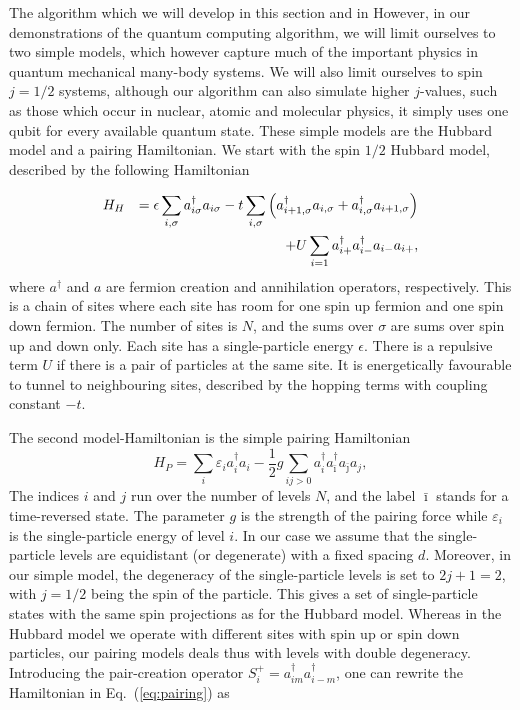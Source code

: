 \documentclass[%
oneside,                 %
final,                   %
10pt]{article}
\begin{document}
The algorithm which we will develop in this section and in
However, 
in our demonstrations of the quantum computing algorithm, we will limit ourselves to
two simple models, which however capture much of the important physics
in quantum mechanical 
many-body systems. We will also limit ourselves to spin $j=1/2$
systems, although our algorithm 
can also simulate  higher $j$-values, such as those which occur in nuclear, atomic and
molecular physics, it simply uses one qubit for every available
quantum state.   
These simple models are the Hubbard model and a pairing
Hamiltonian.
We start with the spin $1/2$ Hubbard model, described by the following Hamiltonian

\begin{align}
H_H &&= \epsilon \sum_{i, \sigma} a_{i\sigma}^\dag a_{i\sigma} 
-t \sum_{i, \sigma} \left(a^\dag_{i+1, \sigma}a_{i, \sigma}
+a^\dag_{i, \sigma}a_{i+1, \sigma} \right) \notag \\
&& + U \sum_{i=1} a_{i+}^\dag a_{i-}^\dag a_{i-}a_{i+},
\label{eq:hubbard}
\end{align}
where $a^{\dagger}$ and $a$ are fermion creation and annihilation operators, respectively.
This is a chain of sites where each site has room for one spin up
fermion and one spin down fermion. 
The number of sites is $N$, and the sums over $\sigma$ are sums over
spin up and down only.
Each site has a single-particle
energy $\epsilon$. There is a repulsive term $U$ if there is a pair
of particles at the same site. It is energetically favourable to tunnel to
neighbouring sites, described by 
the hopping terms with coupling constant $-t$.

The second model-Hamiltonian is the simple pairing Hamiltonian
\begin{equation}
   H_P=\sum_i \varepsilon_i a^{\dagger}_i a_i -\frac{1}{2} g\sum_{ij>0}
           a^{\dagger}_{i}
     a^{\dagger}_{\bar{\imath}}a_{\bar{\jmath}}a_{j},
     \label{eq:pairing}
\end{equation}
 The indices $i$ and $j$ run over the number of levels $N$, and the label $\bar{\imath}$ 
stands for a time-reversed state. The parameter $g$ is the strength of the pairing force 
while $\varepsilon_i$ is the single-particle energy of level $i$. 
In our case
we assume that the single-particle levels are equidistant (or
degenerate) with a fixed spacing $d$. 
Moreover, in our simple model, the degeneracy of the single-particle
levels is set to $2j+1=2$, with $j=1/2$  
being the spin of the particle. This gives a set of single-particle
states with the same spin projections as 
for the Hubbard model.  Whereas in the Hubbard model we operate with
different sites with  
spin up or spin down particles, our pairing models deals thus with
levels  with double degeneracy. 
Introducing the pair-creation operator 
$S^+_i=a^{\dagger}_{im}a^{\dagger}_{i-m}$,
one can rewrite the Hamiltonian in 
Eq.~(\ref{eq:pairing}) as
\end{document}
